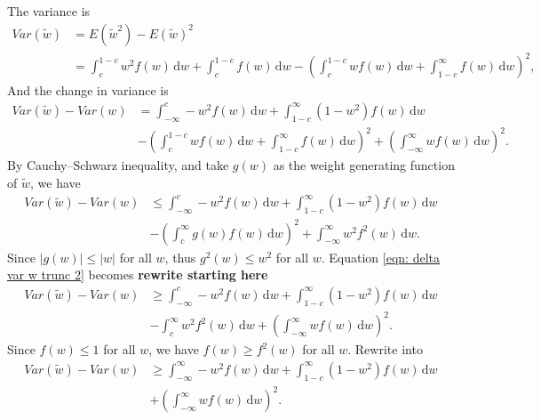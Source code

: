 \documentclass[]{article}
\begin{document}
The variance is \begin{equation}
\label{eqn: var w trunc}
\begin{aligned}
Var(\tilde{w}) &= E(\tilde{w}^{2})-E(\tilde{w})^2\\
&=\int_c^{1-c} w^2f(w)\,\mathrm{d}w+\int_c^{1-c} f(w)\,\mathrm{d}w - (\int_c^{1-c} wf(w)\,\mathrm{d}w+\int_{1-c}^{\infty} f(w)\,\mathrm{d}w)^2,
\end{aligned}
\end{equation} And the change in variance is \begin{equation}
\label{eqn: delta var w trunc 1}
\begin{aligned}
Var(\tilde{w}) - Var(w) &=\int_{-\infty}^{c} -w^2f(w)\,\mathrm{d}w+\int_{1-c}^{\infty} (1-w^2)f(w)\,\mathrm{d}w \\
& - (\int_c^{1-c} wf(w)\,\mathrm{d}w + \int_{1-c}^{\infty} f(w)\,\mathrm{d}w)^2 + (\int_{-\infty}^{\infty} wf(w)\,\mathrm{d}w)^2.
\end{aligned}
\end{equation} By Cauchy--Schwarz inequality, and take \(g(w)\) as the
weight generating function of \(\tilde{w}\), we have \begin{equation}
\label{eqn: delta var w trunc 2}
\begin{aligned}
Var(\tilde{w}) - Var(w) &\leq \int_{-\infty}^{c} -w^2f(w)\,\mathrm{d}w+\int_{1-c}^{\infty} (1-w^2)f(w)\,\mathrm{d}w \\
& - (\int_c^{\infty} g(w)f(w)\,\mathrm{d}w)^2 + \int_{-\infty}^{\infty} w^2f^2(w)\,\mathrm{d}w.
\end{aligned}
\end{equation} Since \(|g(w)|\leq|w|\) for all \(w\), thus
\(g^2(w) \leq w^2\) for all \(w\). Equation
\ref{eqn: delta var w trunc 2} becomes \textbf{rewrite starting here}
\begin{equation}
\label{eqn: delta var w trunc 3}
\begin{aligned}
Var(\tilde{w}) - Var(w) &\geq \int_{-\infty}^{c} -w^2f(w)\,\mathrm{d}w+\int_{1-c}^{\infty} (1-w^2)f(w)\,\mathrm{d}w \\
& - \int_c^{\infty} w^2f^2(w)\,\mathrm{d}w + (\int_{-\infty}^{\infty} wf(w)\,\mathrm{d}w)^2.
\end{aligned}
\end{equation} Since \(f(w)\leq 1\) for all \(w\), we have
\(f(w)\geq f^2(w)\) for all \(w\). Rewrite into \begin{equation}
\label{eqn: delta var w trunc 3}
\begin{aligned}
Var(\tilde{w}) - Var(w) &\geq \int_{-\infty}^{\infty} -w^2f(w)\,\mathrm{d}w+\int_{1-c}^{\infty} (1-w^2)f(w)\,\mathrm{d}w \\
& + (\int_{-\infty}^{\infty} wf(w)\,\mathrm{d}w)^2.
\end{aligned}
\end{equation}
\end{document}
